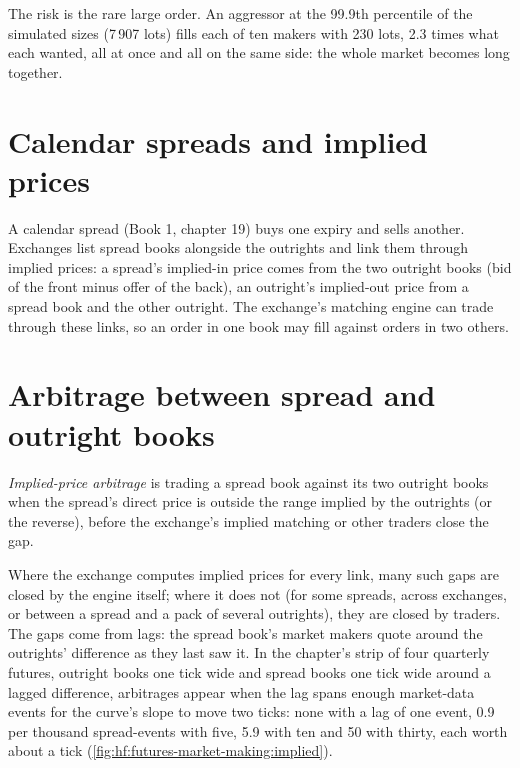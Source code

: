 The risk is the rare large order. An aggressor at the 99.9th percentile of the simulated sizes (7\,907 lots) fills each of ten makers with 230 lots,
2.3 times what each wanted, all at once and all on the same side: the whole market becomes long together.

\section{Calendar spreads and implied prices}

A calendar spread (Book 1, chapter 19) buys one expiry and sells another. Exchanges list spread books alongside the outrights and link them through
implied prices: a spread's implied-in price comes from the two outright books (bid of the front minus offer of the back), an outright's implied-out
price from a spread book and the other outright. The exchange's matching engine can trade through these links, so an order in one book may fill
against orders in two others.

\section{Arbitrage between spread and outright books}

\begin{definition}\label{def:hf:futures-market-making:implied}
\emph{Implied-price arbitrage} is trading a spread book against its two outright books when the spread's direct
price is outside the range implied by the outrights (or the reverse), before the exchange's implied matching or other traders close the gap.
\end{definition}

Where the exchange computes implied prices for every link, many such gaps are closed by the engine itself; where it does not (for some spreads,
across exchanges, or between a spread and a pack of several outrights), they are closed by traders. The gaps come from lags: the spread book's market
makers quote around the outrights' difference as they last saw it. In the chapter's strip of four quarterly futures, outright books one tick wide and
spread books one tick wide around a lagged difference, arbitrages appear when the lag spans enough market-data events for the curve's slope to move
two ticks: none with a lag of one event, 0.9 per thousand spread-events with five, 5.9 with ten and 50 with thirty, each worth about a tick
(\cref{fig:hf:futures-market-making:implied}).

